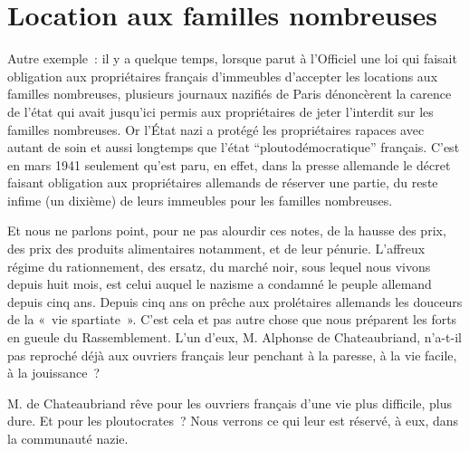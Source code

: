 \documentclass[french,twoside]{book} %
\begin{document}
\section[Location aux familles nombreuses]{Location aux familles nombreuses}
\noindent Autre exemple : il y a quelque temps, lorsque parut à l’Officiel une loi qui faisait obligation aux propriétaires français d’immeubles d’accepter les locations aux familles nombreuses, plusieurs journaux nazifiés de Paris dénoncèrent la carence de l’état qui avait jusqu’ici permis aux propriétaires de jeter l’interdit sur les familles nombreuses. Or l’État nazi a protégé les propriétaires rapaces avec autant de soin et aussi longtemps que l’état “ploutodémocratique” français. C’est en mars 1941 seulement qu’est paru, en effet, dans la presse allemande le décret faisant obligation aux propriétaires allemands de réserver une partie, du reste infime (un dixième) de leurs immeubles pour les familles nombreuses.\par
Et nous ne parlons point, pour ne pas alourdir ces notes, de la hausse des prix, des prix des produits alimentaires notamment, et de leur pénurie. L’affreux régime du rationnement, des ersatz, du marché noir, sous lequel nous vivons depuis huit mois, est celui auquel le nazisme a condamné le peuple allemand depuis cinq ans. Depuis cinq ans on prêche aux prolétaires allemands les douceurs de la « vie spartiate ». C’est cela et pas autre chose que nous préparent les forts en gueule du Rassemblement. L’un d’eux, M. Alphonse de Chateaubriand, n’a-t-il pas reproché déjà aux ouvriers français leur penchant à la paresse, à la vie facile, à la jouissance ?\par
M. de Chateaubriand rêve pour les ouvriers français d’une vie plus difficile, plus dure. Et pour les ploutocrates ? Nous verrons ce qui leur est réservé, à eux, dans la communauté nazie.
\end{document}
